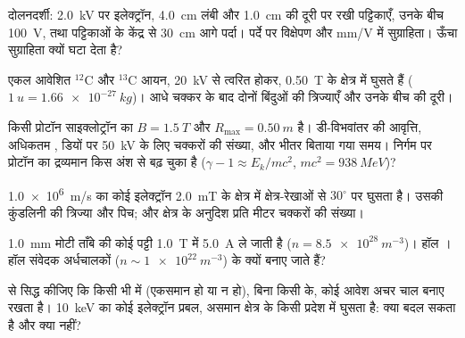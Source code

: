 \begin{exercise}[$\star\star$]\label{exo:b1:charged-particles:5}
दोलनदर्शी: \qty{2.0}{kV} पर इलेक्ट्रॉन, \qty{4.0}{cm} लंबी और
\qty{1.0}{cm} की दूरी पर रखी पट्टिकाएँ, उनके बीच \qty{100}{V}, तथा
पट्टिकाओं के केंद्र से \qty{30}{cm} आगे पर्दा। पर्दे पर विक्षेपण और mm/V
में सुग्राहिता। ऊँचा  सुग्राहिता क्यों घटा देता है?
\end{exercise}

\begin{exercise}[$\star\star$]\label{exo:b1:charged-particles:6}
एकल आवेशित $^{12}$C और $^{13}$C आयन, \qty{20}{kV} से त्वरित होकर,
\qty{0.50}{T} के क्षेत्र में घुसते हैं ($\qty{1}{u} = \qty{1.66e-27}{kg}$)।
आधे चक्कर के बाद दोनों बिंदुओं की त्रिज्याएँ और उनके बीच की दूरी।
\end{exercise}

\begin{exercise}[$\star\star$]\label{exo:b1:charged-particles:7}
किसी प्रोटॉन साइक्लोट्रॉन का $B = \qty{1.5}{T}$ और $R_{\max} = \qty{0.50}{m}$
है। डी-विभवांतर की आवृत्ति, अधिकतम , डियों पर \qty{50}{kV} के
लिए चक्करों की संख्या, और भीतर बिताया गया समय। निर्गम पर प्रोटॉन का
द्रव्यमान किस अंश से बढ़ चुका है ($\gamma - 1 \approx E_k/mc^2$,
$mc^2 = \qty{938}{MeV}$)?
\end{exercise}

\begin{exercise}[$\star\star$]\label{exo:b1:charged-particles:8}
\qty{1.0e6}{m/s} का कोई इलेक्ट्रॉन \qty{2.0}{mT} के क्षेत्र में
क्षेत्र-रेखाओं से $30^\circ$ पर घुसता है। उसकी कुंडलिनी की त्रिज्या और
पिच; और क्षेत्र के अनुदिश प्रति मीटर चक्करों की संख्या।
\end{exercise}

\begin{exercise}[$\star\star$]\label{exo:b1:charged-particles:9}
\qty{1.0}{mm} मोटी ताँबे की कोई पट्टी \qty{1.0}{T} में \qty{5.0}{A} ले जाती
है ($n = \qty{8.5e28}{m^{-3}}$)। हॉल । हॉल संवेदक अर्धचालकों
($n \sim \qty{1e22}{m^{-3}}$) के क्यों बनाए जाते हैं?
\end{exercise}

\begin{exercise}[$\star\star\star$]\label{exo:b1:charged-particles:10}
 से सिद्ध कीजिए कि किसी भी  में (एकसमान हो या
न हो), बिना किसी  के, कोई आवेश अचर चाल बनाए रखता है।
\qty{10}{keV} का कोई इलेक्ट्रॉन प्रबल, असमान क्षेत्र के किसी प्रदेश में
घुसता है: क्या बदल सकता है और क्या नहीं?
\end{exercise}

